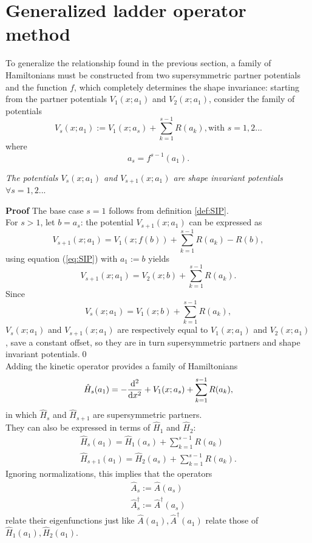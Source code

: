 \section{Generalized ladder operator method}
To generalize the relationship found in the previous section, a family of Hamiltonians must be
constructed from two supersymmetric partner potentials and
the function $f$, which completely determines the shape invariance:
starting from the partner potentials $V_1(x;a_1)$ and $V_2(x;a_1)$, 
consider the family of potentials
\begin{equation}
V_s(x;a_1):=V_1(x;a_s)+\sum_{k=1}^{s-1}R(a_k),\text{with }s=1,2...
\label{eq:SIP_family}
\end{equation}
where
$$a_s = f^{s-1}(a_1).$$
\begin{thm}
    \textit{The potentials $V_s(x;a_1)$ and $V_{s+1}(x;a_1)$ are shape invariant potentials
    $\forall s=1,2...$}
\end{thm}
\textbf{Proof} The base case $s=1$ follows from definition \ref{def:SIP}.\\
For $s>1$, let $b=a_s$: the potential $V_{s+1}(x;a_1)$ can be expressed as
$$V_{s+1}(x;a_1)=V_1(x;f(b))+\sum_{k=1}^{s-1}R(a_k)-R(b),$$
using equation (\ref{eq:SIP}) with $a_1:=b$ yields
$$V_{s+1}(x;a_1) = V_2(x;b)+\sum_{k=1}^{s-1}R(a_k).$$
Since
$$V_s(x;a_1) = V_1(x;b)+\sum_{k=1}^{s-1}R(a_k),$$
$V_s(x;a_1)$ and $V_{s+1}(x;a_1)$ are respectively equal to $V_1(x;a_1)$ and $V_2(x;a_1)$, save
a constant offset, so they are in turn supersymmetric partners and shape invariant
potentials.\qed\\

 Adding the kinetic operator provides a family of Hamiltonians
$$\hat H_s(a_1) = -\dv[2]{}{x} + V_1(x;a_s) + \sum_{k=1}^{s-1}R(a_k),$$
in which $\hat H_s$ and $\hat H_{s+1}$ are supersymmetric partners.\\
They can also be expressed in terms of $\hat H_1$ and $\hat H_2$:
\begin{gather*}
\hat H_s(a_1) = \hat H_1(a_s)+\sum_{k=1}^{s-1}R(a_k)\\
\hat H_{s+1}(a_1) = \hat H_2(a_s)+\sum_{k=1}^{s-1}R(a_k).
\end{gather*}
Ignoring normalizations, this implies that the operators
\begin{gather*}
\hat A_s := \hat A(a_s)\\
\hat A_s^\dagger :=\hat A^\dagger(a_s)
\end{gather*}
relate their eigenfunctions just like $\hat A(a_1), \hat A^\dagger(a_1)$ relate those of
$\hat H_1(a_1), \hat H_2(a_1)$.\\

